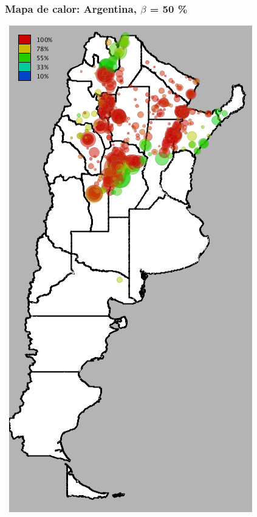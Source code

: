 \documentclass[xcolor=x11names]{beamer}
\begin{document}
\begin{frame}
	\frametitle{Mapa de calor: Argentina, $\beta$ = 50 \%}
	\center\
	\includegraphics[height=.9\textheight,width = .9\columnwidth, keepaspectratio]
	{slides/201112_hi_res_argentina_usuarios_proporcion_circulos_beta50.png}
\end{frame}

\end{document}
